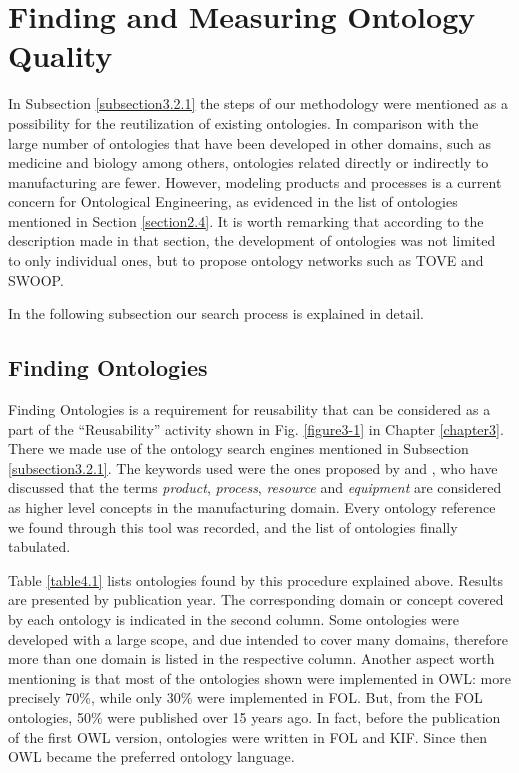 \section{Finding and Measuring Ontology Quality}\label{4.2}

In Subsection \ref{subsection3.2.1} the steps of our methodology were mentioned as a possibility for the reutilization of existing ontologies. In comparison with the large number of ontologies that have been developed in other domains, such as medicine and biology among others, ontologies related directly or indirectly to manufacturing are fewer.  However, modeling products and processes is a current concern for Ontological Engineering, as evidenced in the list of ontologies mentioned in Section \ref{section2.4}. It is worth remarking that according to the description made in that section, the development of ontologies was not limited to only individual ones, but to propose ontology networks such as TOVE and SWOOP. 

In the following subsection our search process is explained in detail. 


\subsection{Finding Ontologies}\label{4.2.1}

Finding Ontologies is a requirement for reusability that can be considered as a part of the “Reusability” activity shown in Fig. \ref{figure3-1} in Chapter \ref{chapter3}. There we made use of the ontology search engines mentioned in Subsection \ref{subsection3.2.1}. The keywords used were the ones proposed by \cite{martin_design_2003} and \cite{lastra_ontologies_2009}, who have discussed that the terms \textit{product}, \textit{process},  \textit{resource} and \textit{equipment} are considered as higher level concepts in the manufacturing domain. Every ontology reference we found through this tool was recorded, and the list of ontologies finally tabulated.

Table \ref{table4.1} lists ontologies found by this procedure explained above. Results are presented by publication year. The corresponding domain or concept covered by each ontology is indicated in the second column. Some ontologies were developed with a large scope, and due intended to cover many domains, therefore more than one domain is listed in the respective column. Another aspect worth mentioning is that most of the ontologies shown were implemented in OWL: more precisely 70\%, while only 30\% were implemented in FOL. But, from the FOL ontologies, 50\% were published over 15 years ago. In fact, before the publication of the first OWL version, ontologies were written in FOL and KIF. Since then OWL became the preferred ontology language. 

